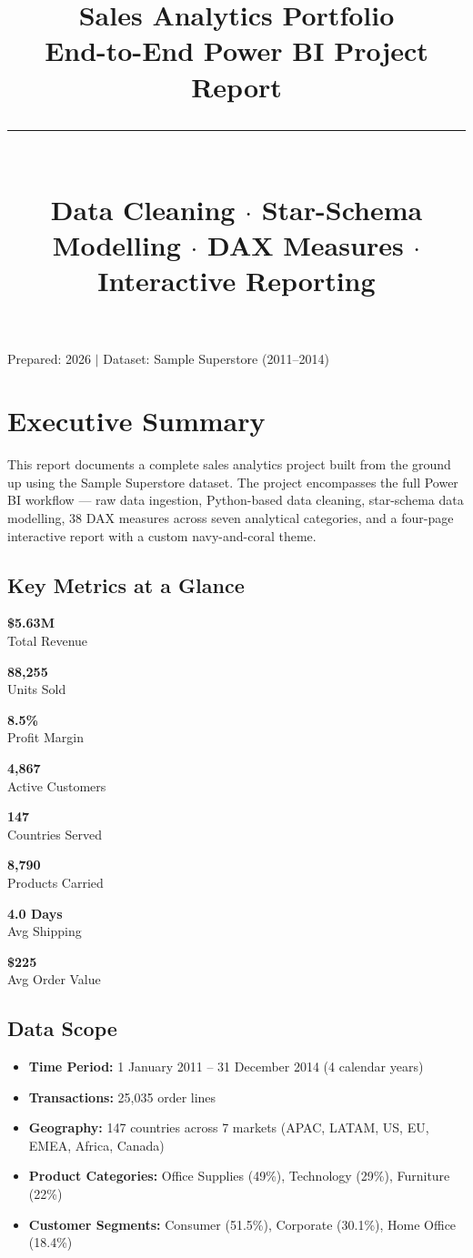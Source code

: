 \documentclass[11pt,a4paper]{article}
\title{
    \vspace{4em}
    {\color{navy}\Huge\bfseries Sales Analytics Portfolio}\\[0.6em]
    {\color{coral}\Large End-to-End Power BI Project Report}\\[1.2em]
    \rule{0.6\textwidth}{1.5pt}\\[0.8em]
    {\large \textcolor{darktext}{Data Cleaning \;$\cdot$\; Star-Schema Modelling \;$\cdot$\; 38 DAX Measures \;$\cdot$\; Interactive Reporting}}\\[5em]
}
\author{}
\date{}
\newcommand{\kpi}[2]{%
    \begin{minipage}[b]{0.23\textwidth}
        \centering
        {\color{navy}\LARGE\bfseries #1}\\[0.2em]
        {\color{darktext}\small #2}
    \end{minipage}%
}
\begin{document}
\sloppy
\maketitle
\thispagestyle{empty}
\vfill
\begin{center}
    {\small Prepared: 2026 \;$\mid$\; Dataset: Sample Superstore (2011–2014)}
\end{center}
\newpage

\tableofcontents
\newpage

\section{Executive Summary}

This report documents a complete sales analytics project built from the ground up using the Sample Superstore dataset. The project encompasses the full Power BI workflow --- raw data ingestion, Python-based data cleaning, star-schema data modelling, 38 DAX measures across seven analytical categories, and a four-page interactive report with a custom navy-and-coral theme.

\subsection*{Key Metrics at a Glance}

\vspace{1em}
\begin{center}
\kpi{\$5.63M}{Total Revenue}\hfill
\kpi{88,255}{Units Sold}\hfill
\kpi{8.5\%}{Profit Margin}\hfill
\kpi{4,867}{Active Customers}
\end{center}

\vspace{1.5em}
\begin{center}
\kpi{147}{Countries Served}\hfill
\kpi{8,790}{Products Carried}\hfill
\kpi{4.0 Days}{Avg Shipping}\hfill
\kpi{\$225}{Avg Order Value}
\end{center}

\subsection*{Data Scope}
\begin{itemize}[nosep]
    \item \textbf{Time Period:} 1 January 2011 -- 31 December 2014 (4 calendar years)
    \item \textbf{Transactions:} 25,035 order lines
    \item \textbf{Geography:} 147 countries across 7 markets (APAC, LATAM, US, EU, EMEA, Africa, Canada)
    \item \textbf{Product Categories:} Office Supplies (49\%), Technology (29\%), Furniture (22\%)
    \item \textbf{Customer Segments:} Consumer (51.5\%), Corporate (30.1\%), Home Office (18.4\%)
\end{itemize}
\end{document}
